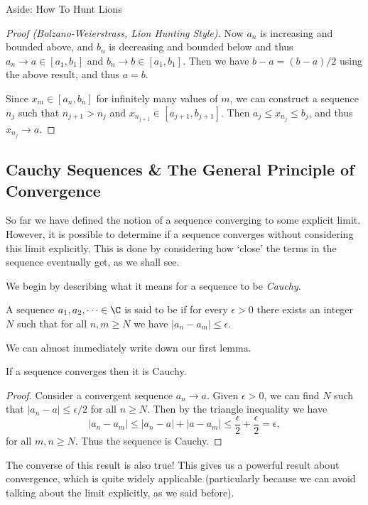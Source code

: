 \documentclass[a4paper]{scrartcl}
\begin{document}
\begin{aside}{Aside: How To Hunt Lions}
\begin{proof}[Proof (Bolzano-Weierstrass, Lion Hunting Style)]
	Now $a_n$ is increasing and bounded above, and $b_n$ is decreasing and bounded below and thus $a_n \rightarrow a \in [a_1, b_1]$ and $b_n \rightarrow b \in [a_1, b_1]$. Then we have $b - a = (b - a)/2$ using the above result, and thus $a = b$.

	Since $x_m \in [a_n, b_n]$ for infinitely many values of $m$, we can construct a sequence $n_j$ such that $n_{j + 1} > n_j$ and $x_{n_{j + 1}} \in [a_{j + 1}, b_{j + 1}]$. Then $a_j \leq x_{n_j} \leq b_j$, and thus $x_{n_j} \rightarrow a$.
\end{proof}
\end{aside}




\subsection{Cauchy Sequences \& The General Principle of Convergence}

So far we have defined the notion of a sequence converging to some explicit limit. However, it is possible to determine if a sequence converges without considering this limit explicitly. This is done by considering how `close' the terms in the sequence eventually get, as we shall see.

We begin by describing what it means for a sequence to be \emph{Cauchy}.

\begin{definition}
	A sequence $a_1, a_2, \dots \in \C$ is said to be  if for every $\epsilon > 0$ there exists an integer $N$ such that for all $n, m \geq N$ we have $|a_n - a_m| \leq \epsilon$.
\end{definition}

We can almost immediately write down our first lemma.

\begin{lemma}
	If a sequence converges then it is Cauchy.
\end{lemma}
\begin{proof}
	Consider a convergent sequence $a_n \rightarrow a$.
	Given $\epsilon > 0$, we can find $N$ such that
	$|a_n - a| \leq \epsilon / 2$ for all $n \geq N$.
	Then by the triangle inequality we have
	$$
	|a_n - a_m| \leq |a_n - a| + |a - a_m| \leq \frac{\epsilon}{2} + \frac{\epsilon}{2} = \epsilon,
	$$
	for all $m, n \geq N$. Thus the sequence is Cauchy.
\end{proof}

The converse of this result is also true! This gives us a powerful result about convergence, which is quite widely applicable (particularly because we can avoid talking about the limit explicitly, as we said before).
\end{document}
